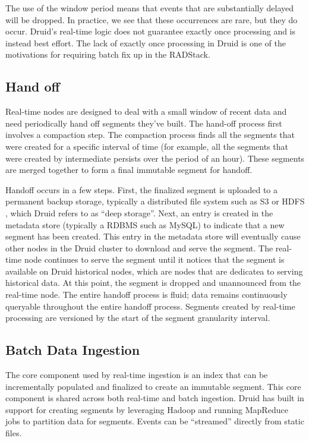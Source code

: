 \documentclass{vldb}
\begin{document}
{The use of the window period means that events that are substantially delayed
will be dropped. In practice, we see that these occurrences are rare, but they
do occur. Druid’s real-time logic does not guarantee exactly once processing
and is instead best effort. The lack of exactly once processing in Druid is one
of the motivations for requiring batch fix up in the RADStack.

\subsection{Hand off}
Real-time nodes are designed to deal with a small window of recent data and
need periodically hand off segments they’ve built. The hand-off process first
involves a compaction step. The compaction process finds all the segments that
were created for a specific interval of time (for example, all the segments
that were created by intermediate persists over the period of an hour). These
segments are merged together to form a final immutable segment for handoff. 

Handoff occurs in a few steps. First, the finalized segment is uploaded to a
permanent backup storage, typically a distributed file system such as S3
\cite{decandia2007dynamo} or HDFS \cite{shvachko2010hadoop}, which Druid refers
to as “deep storage”. Next, an entry is created in the metadata store
(typically a RDBMS such as MySQL) to indicate that a new segment has been
created. This entry in the metadata store will eventually cause other nodes in
the Druid cluster to download and serve the segment. The real-time node
continues to serve the segment until it notices that the segment is available
on Druid historical nodes, which are nodes that are dedicatea to serving
historical data. At this point, the segment is dropped and unannounced from the
real-time node. The entire handoff process is fluid; data remains continuously
queryable throughout the entire handoff process. Segments created by real-time
processing are versioned by the start of the segment granularity interval.

\subsection{Batch Data Ingestion}
The core component used by real-time ingestion is an index that can be
incrementally populated and finalized to create an immutable segment. This core
component is shared across both real-time and batch ingestion. Druid has built
in support for creating segments by leveraging Hadoop and running MapReduce
jobs to partition data for segments.  Events can be “streamed” directly from
static files.

}
\end{document}
